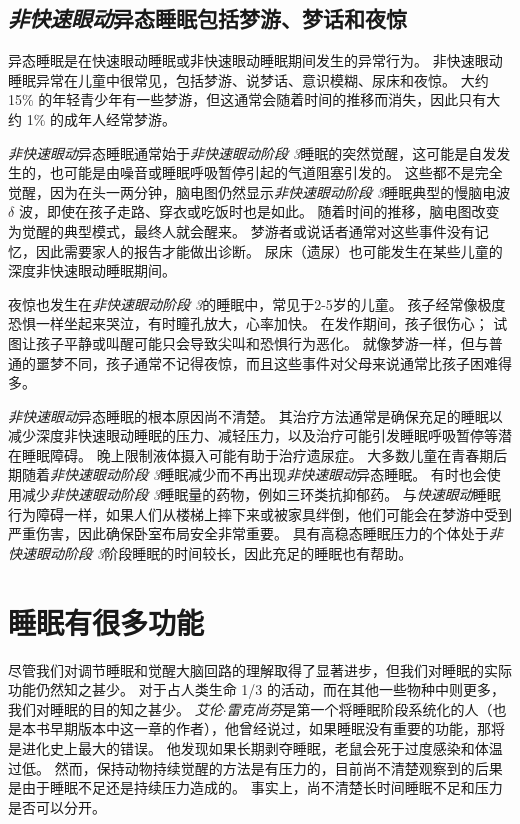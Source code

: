 \subsection{\textit{非快速眼动}异态睡眠包括梦游、梦话和夜惊}

异态睡眠是在快速眼动睡眠或非快速眼动睡眠期间发生的异常行为。
非快速眼动睡眠异常在儿童中很常见，包括梦游、说梦话、意识模糊、尿床和夜惊。
大约 15\% 的年轻青少年有一些梦游，但这通常会随着时间的推移而消失，因此只有大约 1\% 的成年人经常梦游。


\textit{非快速眼动}异态睡眠通常始于\textit{非快速眼动阶段 3}睡眠的突然觉醒，这可能是自发发生的，也可能是由噪音或睡眠呼吸暂停引起的气道阻塞引发的。
这些都不是完全觉醒，因为在头一两分钟，脑电图仍然显示\textit{非快速眼动阶段 3}睡眠典型的慢脑电波 $ \delta $ 波，即使在孩子走路、穿衣或吃饭时也是如此。
随着时间的推移，脑电图改变为觉醒的典型模式，最终人就会醒来。
梦游者或说话者通常对这些事件没有记忆，因此需要家人的报告才能做出诊断。
尿床（遗尿）也可能发生在某些儿童的深度非快速眼动睡眠期间。


夜惊也发生在\textit{非快速眼动阶段 3}的睡眠中，常见于2-5岁的儿童。
孩子经常像极度恐惧一样坐起来哭泣，有时瞳孔放大，心率加快。
在发作期间，孩子很伤心；
试图让孩子平静或叫醒可能只会导致尖叫和恐惧行为恶化。
就像梦游一样，但与普通的噩梦不同，孩子通常不记得夜惊，而且这些事件对父母来说通常比孩子困难得多。


\textit{非快速眼动}异态睡眠的根本原因尚不清楚。
其治疗方法通常是确保充足的睡眠以减少深度非快速眼动睡眠的压力、减轻压力，以及治疗可能引发睡眠呼吸暂停等潜在睡眠障碍。
晚上限制液体摄入可能有助于治疗遗尿症。
大多数儿童在青春期后期随着\textit{非快速眼动阶段 3}睡眠减少而不再出现\textit{非快速眼动}异态睡眠。
有时也会使用减少\textit{非快速眼动阶段 3}睡眠量的药物，例如三环类抗抑郁药。
与\textit{快速眼动}睡眠行为障碍一样，如果人们从楼梯上摔下来或被家具绊倒，他们可能会在梦游中受到严重伤害，因此确保卧室布局安全非常重要。
具有高稳态睡眠压力的个体处于\textit{非快速眼动阶段 3}阶段睡眠的时间较长，因此充足的睡眠也有帮助。



\section{睡眠有很多功能}

尽管我们对调节睡眠和觉醒大脑回路的理解取得了显著进步，但我们对睡眠的实际功能仍然知之甚少。
对于占人类生命 1/3 的活动，而在其他一些物种中则更多，我们对睡眠的目的知之甚少。
\textit{艾伦$\cdot$雷克尚芬}是第一个将睡眠阶段系统化的人（也是本书早期版本中这一章的作者），他曾经说过，如果睡眠没有重要的功能，那将是进化史上最大的错误。
他发现如果长期剥夺睡眠，老鼠会死于过度感染和体温过低。
然而，保持动物持续觉醒的方法是有压力的，目前尚不清楚观察到的后果是由于睡眠不足还是持续压力造成的。
事实上，尚不清楚长时间睡眠不足和压力是否可以分开。


